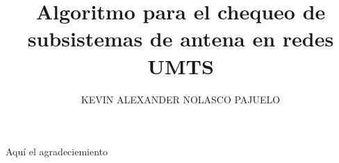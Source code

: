 \documentclass[spanish,GMAT]{TFGEPSUIB}
\title{Algoritmo para el chequeo de subsistemas de antena en redes UMTS}
\author{\MakeUppercase{Kevin Alexander Nolasco Pajuelo}}
\begin{document}
\portada

\frontmatter


%
\cleartorecto \thispagestyle{empty}
\begin{agraiments}
Aquí el agradeciemiento
\end{agraiments}

\cleartorecto \tableofcontents

\cleartorecto \listoffigures
\cleartorecto \listoftables 

 

 

\mainmatter\pagestyle{ruled}











\appendix 
 



\backmatter



 
\end{document}
